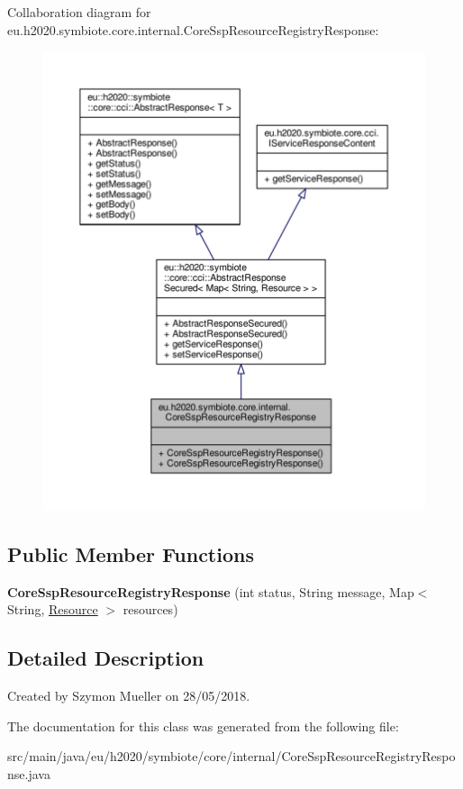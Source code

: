 Collaboration diagram for eu.\+h2020.\+symbiote.\+core.\+internal.\+Core\+Ssp\+Resource\+Registry\+Response\+:\nopagebreak
\begin{figure}[H]
\begin{center}
\leavevmode
\includegraphics[width=350pt]{classeu_1_1h2020_1_1symbiote_1_1core_1_1internal_1_1CoreSspResourceRegistryResponse__coll__graph}
\end{center}
\end{figure}
\subsection*{Public Member Functions}
\begin{DoxyCompactItemize}
\item 
\mbox{\label{classeu_1_1h2020_1_1symbiote_1_1core_1_1internal_1_1CoreSspResourceRegistryResponse_abbd3bd23bb9021c809a2a42328f41e8c}} 
{\bfseries Core\+Ssp\+Resource\+Registry\+Response} (int status, String message, Map$<$ String, \hyperlink{classeu_1_1h2020_1_1symbiote_1_1model_1_1cim_1_1Resource}{Resource} $>$ resources)
\end{DoxyCompactItemize}


\subsection{Detailed Description}
Created by Szymon Mueller on 28/05/2018. 

The documentation for this class was generated from the following file\+:\begin{DoxyCompactItemize}
\item 
src/main/java/eu/h2020/symbiote/core/internal/Core\+Ssp\+Resource\+Registry\+Response.\+java\end{DoxyCompactItemize}
